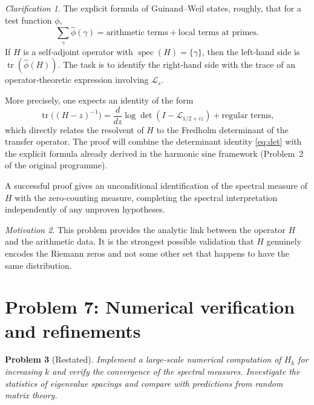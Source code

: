 \documentclass[11pt,a4paper]{article}
\newtheorem{problem}{Problem}[section]
\theoremstyle{remark}
\newtheorem{clarification}[problem]{Clarification}
\newtheorem{motivation}[problem]{Motivation}
\newcommand{\cL}{\mathcal{L}}
\DeclareMathOperator{\spec}{spec}
\DeclareMathOperator{\tr}{tr}
\begin{document}
\begin{clarification}
The explicit formula of Guinand--Weil states, roughly, that for a test function $\phi$,
\[
\sum_{\gamma}\widehat{\phi}(\gamma) = \text{arithmetic terms} + \text{local terms at primes}.
\]
If $H$ is a self‑adjoint operator with $\spec(H)=\{\gamma\}$, then the left‑hand side is $\tr(\widehat{\phi}(H))$. The task is to identify the right‑hand side with the trace of an operator‑theoretic expression involving $\cL_s$.

More precisely, one expects an identity of the form
\[
\tr\big((H-z)^{-1}\big) = \frac{d}{dz}\log\det(I-\cL_{1/2+iz}) + \text{regular terms},
\]
which directly relates the resolvent of $H$ to the Fredholm determinant of the transfer operator. The proof will combine the determinant identity \eqref{eq:det} with the explicit formula already derived in the harmonic sine framework (Problem~2 of the original programme).

A successful proof gives an unconditional identification of the spectral measure of $H$ with the zero‑counting measure, completing the spectral interpretation independently of any unproven hypotheses.
\end{clarification}

\begin{motivation}
This problem provides the analytic link between the operator $H$ and the arithmetic data. It is the strongest possible validation that $H$ genuinely encodes the Riemann zeros and not some other set that happens to have the same distribution.
\end{motivation}

\section{Problem 7: Numerical verification and refinements}

\begin{problem}[Restated]
Implement a large‑scale numerical computation of $H_k$ for increasing $k$ and verify the convergence of the spectral measures. Investigate the statistics of eigenvalue spacings and compare with predictions from random matrix theory.
\end{problem}
\end{document}
